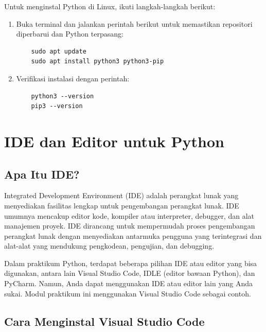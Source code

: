 Untuk menginstal Python di Linux, ikuti langkah-langkah berikut:

\begin{enumerate}
\item Buka terminal dan jalankan perintah berikut untuk memastikan repositori diperbarui dan Python terpasang:
\begin{verbatim}
    sudo apt update
    sudo apt install python3 python3-pip
\end{verbatim}
\item Verifikasi instalasi dengan perintah:
\begin{verbatim}
    python3 --version
    pip3 --version
\end{verbatim}
\end{enumerate}

\section{IDE dan Editor untuk Python}

\subsection{Apa Itu IDE?}

Integrated Development Environment (IDE) adalah perangkat lunak yang menyediakan fasilitas lengkap untuk pengembangan perangkat lunak. IDE umumnya mencakup editor kode, kompiler atau interpreter, debugger, dan alat manajemen proyek. IDE dirancang untuk mempermudah proses pengembangan perangkat lunak dengan menyediakan antarmuka pengguna yang terintegrasi dan alat-alat yang mendukung pengkodean, pengujian, dan debugging.

Dalam praktikum Python, terdapat beberapa pilihan IDE atau editor yang bisa digunakan, antara lain Visual Studio Code, IDLE (editor bawaan Python), dan PyCharm. Namun, Anda dapat menggunakan IDE atau editor lain yang Anda sukai. Modul praktikum ini menggunakan Visual Studio Code sebagai contoh.

\subsection{Cara Menginstal Visual Studio Code}

